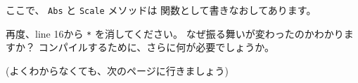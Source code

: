 ここで、 \texttt{Abs} と \texttt{Scale} メソッドは
関数として書きなおしてあります。

再度、line 16から \texttt{*} を消してください。 
なぜ振る舞いが変わったのかわかりますか？ 
コンパイルするために、さらに何が必要でしょうか。

(よくわからなくても、次のページに行きましょう)
